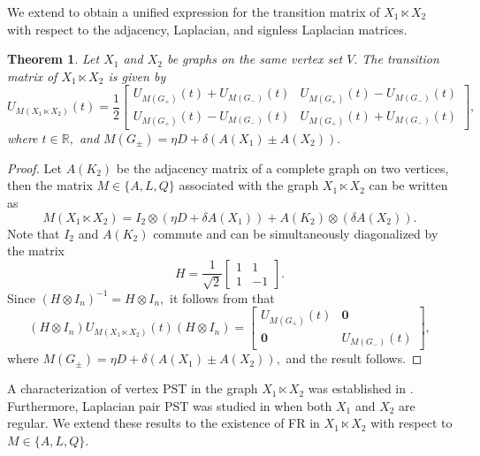 \documentclass[12pt,a4paper]{article}
\newtheorem{thm}{Theorem}
\begin{document}
 We extend \cite[Lemma 5.1]{cou} to obtain a unified expression for the transition matrix of $X_1\ltimes X_2$ with respect to the adjacency, Laplacian, and signless Laplacian matrices. 
 \begin{thm}\label{5t19}
    Let $X_1$ and $X_2$ be graphs on the same vertex set $V.$ 
    The transition matrix of  $X_1\ltimes X_2$ is given by 
 \[U_{M({X_1\ltimes X_2})}(t)=\frac{1}{2}\begin{bmatrix}
    U_{M(G_+)}(t)+ U_{M(G_-)}(t) & U_{M(G_+)}(t)- U_{M(G_-)}(t)\\
    U_{M(G_+)}(t)- U_{M(G_-)}(t)& U_{M(G_+)}(t)+ U_{M(G_-)}(t)
\end{bmatrix},\]
where $t\in \mathbb{R},$ and $M(G_{\pm})=\eta D+\delta(A(X_1)\pm A(X_2)).$
\end{thm}
\begin{proof}
  Let $A(K_2)$ be the adjacency matrix of a complete graph on two vertices, then the matrix $M\in\{A,L,Q\}$ associated with the graph $X_1\ltimes X_2$ can be written as
\[M(X_1\ltimes X_2)=I_2\otimes(\eta D+\delta A(X_1))+A(K_2)\otimes  (\delta A(X_2)). \]  
Note that $I_2$ and $A(K_2)$ commute and can be simultaneously diagonalized by the matrix \[H=\frac{1}{\sqrt{2}}\begin{bmatrix}
    1 & 1\\
    1 & -1
\end{bmatrix}.\] 
Since $(H\otimes I_n)^{-1}=H\otimes I_n,$ it follows from \cite[Lemma 3.1]{cou} that
\[(H\otimes I_n)U_{M(X_1\ltimes X_2)}(t)(H\otimes I_n)=\begin{bmatrix}
    U_{M(G_+)}(t) & \mathbf{0}\\
     \mathbf{0} & U_{M(G_-)}(t)
    \end{bmatrix},\]
    where $M(G_{\pm})=\eta D+\delta(A(X_1)\pm A(X_2)),$ and the result follows. 
\end{proof}
A characterization of vertex PST in the graph $X_1\ltimes X_2$
 was established in \cite[Theorem 5.2]{cou}. Furthermore, Laplacian pair PST was studied in \cite[Theorem 4.2]{jia} when both $X_1$ and $X_2$ are regular. We extend these results to the existence of FR in $X_1\ltimes X_2$ with respect to $M\in\{A,L,Q\}.$ 
\end{document}
